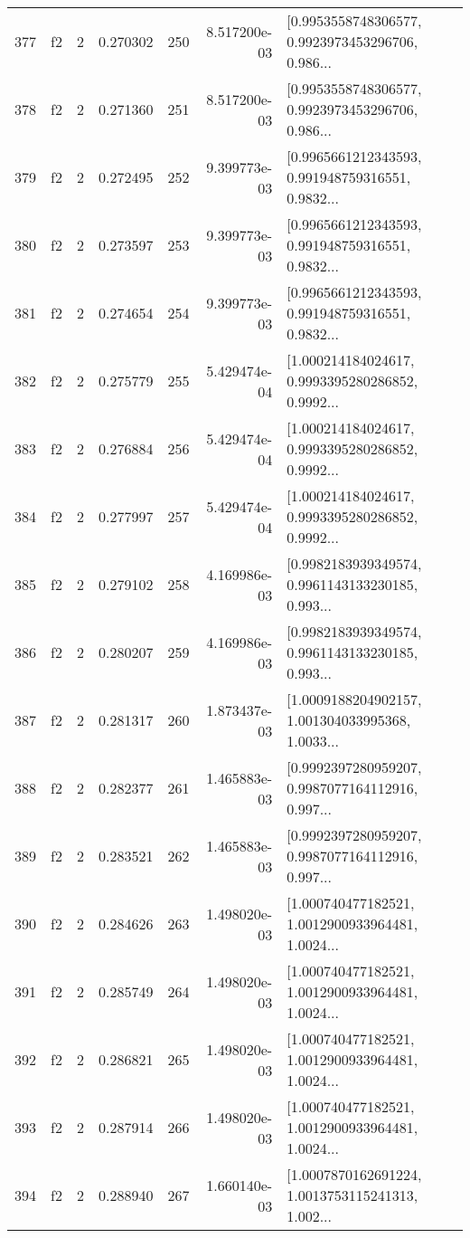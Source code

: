 \begin{tabular}{lllrlrl}
377 &  f2 &   2 &  0.270302 &  250 &  8.517200e-03 &  [0.9953558748306577, 0.9923973453296706, 0.986... \\
378 &  f2 &   2 &  0.271360 &  251 &  8.517200e-03 &  [0.9953558748306577, 0.9923973453296706, 0.986... \\
379 &  f2 &   2 &  0.272495 &  252 &  9.399773e-03 &  [0.9965661212343593, 0.991948759316551, 0.9832... \\
380 &  f2 &   2 &  0.273597 &  253 &  9.399773e-03 &  [0.9965661212343593, 0.991948759316551, 0.9832... \\
381 &  f2 &   2 &  0.274654 &  254 &  9.399773e-03 &  [0.9965661212343593, 0.991948759316551, 0.9832... \\
382 &  f2 &   2 &  0.275779 &  255 &  5.429474e-04 &  [1.000214184024617, 0.9993395280286852, 0.9992... \\
383 &  f2 &   2 &  0.276884 &  256 &  5.429474e-04 &  [1.000214184024617, 0.9993395280286852, 0.9992... \\
384 &  f2 &   2 &  0.277997 &  257 &  5.429474e-04 &  [1.000214184024617, 0.9993395280286852, 0.9992... \\
385 &  f2 &   2 &  0.279102 &  258 &  4.169986e-03 &  [0.9982183939349574, 0.9961143133230185, 0.993... \\
386 &  f2 &   2 &  0.280207 &  259 &  4.169986e-03 &  [0.9982183939349574, 0.9961143133230185, 0.993... \\
387 &  f2 &   2 &  0.281317 &  260 &  1.873437e-03 &  [1.0009188204902157, 1.001304033995368, 1.0033... \\
388 &  f2 &   2 &  0.282377 &  261 &  1.465883e-03 &  [0.9992397280959207, 0.9987077164112916, 0.997... \\
389 &  f2 &   2 &  0.283521 &  262 &  1.465883e-03 &  [0.9992397280959207, 0.9987077164112916, 0.997... \\
390 &  f2 &   2 &  0.284626 &  263 &  1.498020e-03 &  [1.000740477182521, 1.0012900933964481, 1.0024... \\
391 &  f2 &   2 &  0.285749 &  264 &  1.498020e-03 &  [1.000740477182521, 1.0012900933964481, 1.0024... \\
392 &  f2 &   2 &  0.286821 &  265 &  1.498020e-03 &  [1.000740477182521, 1.0012900933964481, 1.0024... \\
393 &  f2 &   2 &  0.287914 &  266 &  1.498020e-03 &  [1.000740477182521, 1.0012900933964481, 1.0024... \\
394 &  f2 &   2 &  0.288940 &  267 &  1.660140e-03 &  [1.0007870162691224, 1.0013753115241313, 1.002... \\

\end{tabular}
